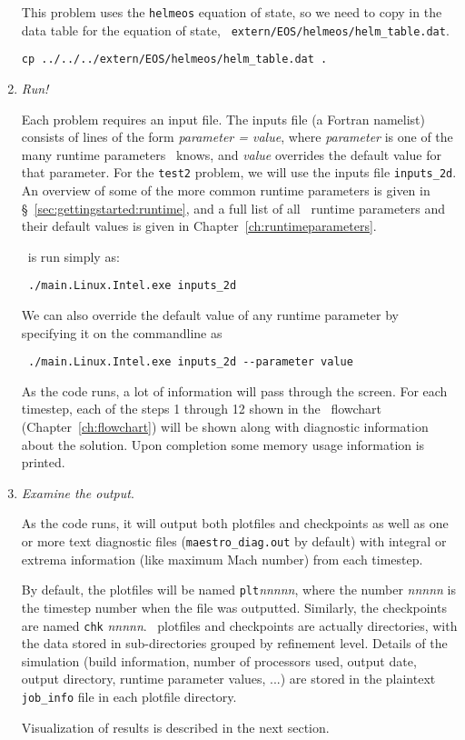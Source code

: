 \begin{enumerate}
This problem uses the {\tt helmeos} equation of state, so 
we need to copy in the data table for the equation of state, {\tt
  extern/EOS/helmeos/helm\_table.dat}.

\begin{verbatim}
cp ../../../extern/EOS/helmeos/helm_table.dat .
\end{verbatim}


\item {\em Run!}

Each problem requires an input file.  The inputs file (a Fortran
namelist) consists of
lines of the form {\em parameter = value}, where {\em parameter} is
one of the many runtime parameters \maestro\ knows, and {\em value}
overrides the default value for that parameter.  For the {\tt test2}
problem, we will use the inputs file {\tt inputs\_2d}.  An overview of
some of the more common runtime parameters is given
in \S~\ref{sec:gettingstarted:runtime}, and a full list of
all \maestro\ runtime parameters and their default values is given in
Chapter~\ref{ch:runtimeparameters}.

\maestro\ is run simply as:
\begin{verbatim}
 ./main.Linux.Intel.exe inputs_2d
\end{verbatim}
We can also override the default value of any runtime parameter by specifying
it on the commandline as
\begin{verbatim}
 ./main.Linux.Intel.exe inputs_2d --parameter value
\end{verbatim}

As the code runs, a lot of information will pass through the screen.
For each timestep, each of the steps 1 through 12 shown in
the \maestro\ flowchart (Chapter~\ref{ch:flowchart}) will be shown
along with diagnostic information about the solution.  Upon completion
some memory usage information is printed.


\item {\em Examine the output}.

As the code runs, it will output both plotfiles and checkpoints as
well as one or more text diagnostic files ({\tt maestro\_diag.out} by
default) with integral or extrema information (like maximum Mach
number) from each timestep.

By default, the plotfiles will be named {\tt plt}{\em nnnnn}, where
the number {\em nnnnn} is the timestep number when the file was
outputted.  Similarly, the checkpoints are named {\tt chk}{\em
nnnnn}.  \boxlib\ plotfiles and checkpoints are actually directories,
with the data stored in sub-directories grouped by refinement level.
Details of the simulation (build information, number of processors
used, output date, output directory, runtime parameter values, ...)
are stored in the plaintext {\tt job\_info} file in each plotfile directory.

Visualization of results is described in the next section.


\end{enumerate}


